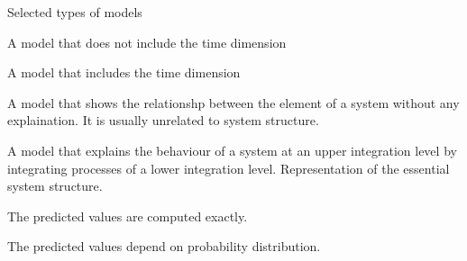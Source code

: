 \documentclass[11pt,dvipsnames,ignorenonframetext,aspectratio=169]{beamer}
\begin{document}
\begin{frame}{Selected types of models}
\protect\hypertarget{selected-types-of-models}{}
\begin{description}
\small
\item[Static] A model that does not include the time dimension
\item[Dynamic] A model that includes the time dimension
\item[Descriptive/functional] A model that shows the relationshp between the element of a system without any explaination. It is usually unrelated to system structure.
\item[Explanatory/mechanistic] A model that explains the behaviour of a system at an upper integration level by integrating processes of a lower integration level. Representation of the essential system structure.
\item[Deterministic] The predicted values are computed exactly.
\item[Stochastic] The predicted values depend on probability distribution.
\end{description}
\end{frame}
\end{document}
